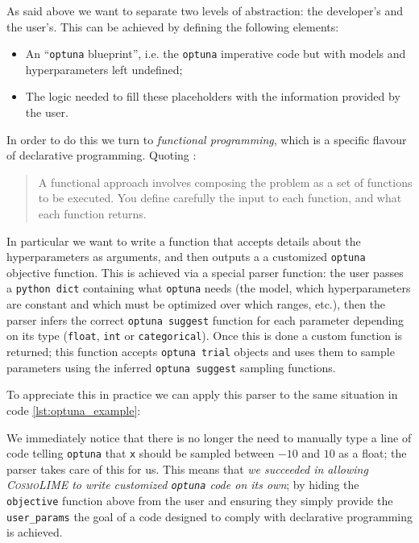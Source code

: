 As said above we want to separate two levels of abstraction: the developer's and the user's. This can be achieved by defining the following elements:
\begin{itemize}
    \item An ``\texttt{optuna} blueprint'', i.e. the \texttt{optuna} imperative code but with models and hyperparameters left undefined;
    \item The logic needed to fill these placeholders with the information provided by the user.
\end{itemize}
In order to do this we turn to \emph{functional programming}, which is a specific flavour of declarative programming.
Quoting \cite{functional_programming}:
\begin{quote}
    A functional approach involves composing the problem as a set of functions to be executed. You define carefully the input to each function, and what each function returns.
\end{quote}
In particular we want to write a function that accepts details about the hyperparameters as arguments, and then outputs a a customized \texttt{optuna} objective function. This is achieved via a special parser function: the user passes a \texttt{python dict} containing what \texttt{optuna} needs (the model, which hyperparameters are constant and which must be optimized over which ranges, etc.), then the parser infers the correct \texttt{optuna suggest} function for each parameter depending on its type (\texttt{float}, \texttt{int} or \texttt{categorical}). Once this is done a custom function is returned; this function accepts \texttt{optuna trial} objects and uses them to sample parameters using the inferred \texttt{optuna suggest} sampling functions.

To appreciate this in practice we can apply this parser to the same situation in code \ref{lst:optuna_example}:

We immediately notice that there is no longer the need to manually type a line of code telling \texttt{optuna} that \texttt{x} should be sampled between $-10$ and $10$ as a float; the parser takes care of this for us. This means that \emph{we succeeded in allowing \textsc{CosmoLIME} to write customized \texttt{optuna} code on its own}; by hiding the \texttt{objective} function above from the user and ensuring they simply provide the \texttt{user\_params} the goal of a code designed to comply with declarative programming is achieved.

